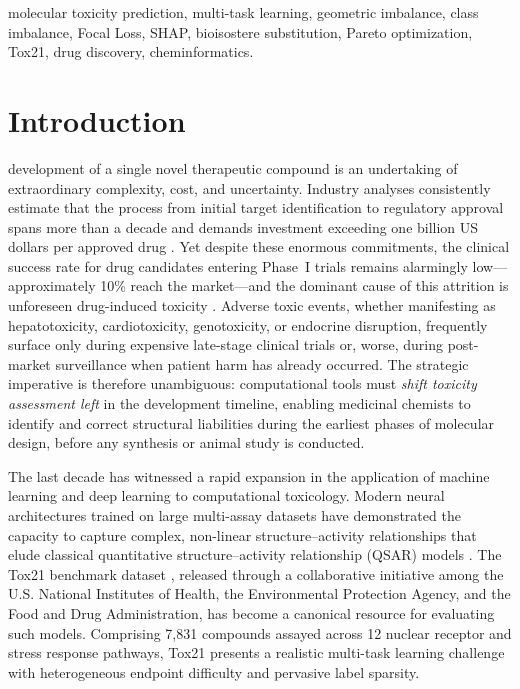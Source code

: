 \documentclass[lettersize,journal]{IEEEtran}
\begin{document}
\begin{IEEEkeywords}
molecular toxicity prediction, multi-task learning, geometric imbalance,
class imbalance, Focal Loss, SHAP, bioisostere substitution, Pareto
optimization, Tox21, drug discovery, cheminformatics.
\end{IEEEkeywords}

  \section{Introduction}
   development of a single novel therapeutic compound is an
  undertaking of extraordinary complexity, cost, and uncertainty.
  Industry analyses consistently estimate that the process from initial target
  identification to regulatory approval spans more than a decade and demands
  investment exceeding one billion US dollars per approved drug \cite{kola2004}.
  Yet despite these enormous commitments, the clinical success rate for drug
  candidates entering Phase~I trials remains alarmingly low---approximately 10\%
  reach the market---and the dominant cause of this attrition is unforeseen
  drug-induced toxicity \cite{sun2022}.
  Adverse toxic events, whether manifesting as hepatotoxicity, cardiotoxicity,
  genotoxicity, or endocrine disruption, frequently surface only during expensive
  late-stage clinical trials or, worse, during post-market surveillance when
  patient harm has already occurred.
  The strategic imperative is therefore unambiguous: computational tools must
  \textit{shift toxicity assessment left} in the development timeline, enabling
  medicinal chemists to identify and correct structural liabilities during the
  earliest phases of molecular design, before any synthesis or animal study is
  conducted.

  The last decade has witnessed a rapid expansion in the application of machine
  learning and deep learning to computational toxicology.
  Modern neural architectures trained on large multi-assay datasets have
  demonstrated the capacity to capture complex, non-linear structure--activity
  relationships that elude classical quantitative structure--activity relationship
  (QSAR) models \cite{zhang2025}.
  The Tox21 benchmark dataset \cite{tox21}, released through a collaborative
  initiative among the U.S. National Institutes of Health, the Environmental
  Protection Agency, and the Food and Drug Administration, has become a canonical
  resource for evaluating such models.
  Comprising 7,831 compounds assayed across 12 nuclear receptor and stress
  response pathways, Tox21 presents a realistic multi-task learning challenge
  with heterogeneous endpoint difficulty and pervasive label sparsity.
\end{document}
